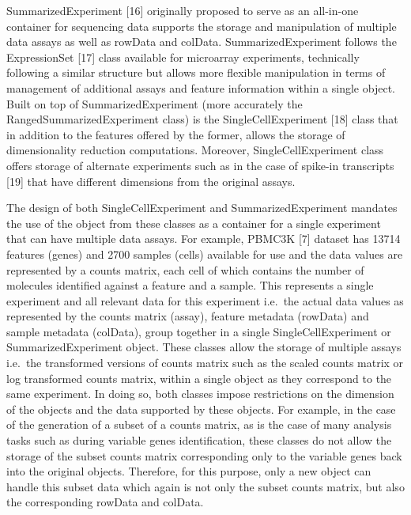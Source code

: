 \documentclass[
]{article}
\begin{document}
SummarizedExperiment {[}16{]} originally proposed to serve as an
all-in-one container for sequencing data supports the storage and
manipulation of multiple data assays as well as rowData and colData.
SummarizedExperiment follows the ExpressionSet {[}17{]} class available
for microarray experiments, technically following a similar structure
but allows more flexible manipulation in terms of management of
additional assays and feature information within a single object. Built
on top of SummarizedExperiment (more accurately the
RangedSummarizedExperiment class) is the SingleCellExperiment {[}18{]}
class that in addition to the features offered by the former, allows the
storage of dimensionality reduction computations. Moreover,
SingleCellExperiment class offers storage of alternate experiments such
as in the case of spike-in transcripts {[}19{]} that have different
dimensions from the original assays.

The design of both SingleCellExperiment and SummarizedExperiment
mandates the use of the object from these classes as a container for a
single experiment that can have multiple data assays. For example,
PBMC3K {[}7{]} dataset has 13714 features (genes) and 2700 samples
(cells) available for use and the data values are represented by a
counts matrix, each cell of which contains the number of molecules
identified against a feature and a sample. This represents a single
experiment and all relevant data for this experiment i.e.~the actual
data values as represented by the counts matrix (assay), feature
metadata (rowData) and sample metadata (colData), group together in a
single SingleCellExperiment or SummarizedExperiment object. These
classes allow the storage of multiple assays i.e.~the transformed
versions of counts matrix such as the scaled counts matrix or log
transformed counts matrix, within a single object as they correspond to
the same experiment. In doing so, both classes impose restrictions on
the dimension of the objects and the data supported by these objects.
For example, in the case of the generation of a subset of a counts
matrix, as is the case of many analysis tasks such as during variable
genes identification, these classes do not allow the storage of the
subset counts matrix corresponding only to the variable genes back into
the original objects. Therefore, for this purpose, only a new object can
handle this subset data which again is not only the subset counts
matrix, but also the corresponding rowData and colData.
\end{document}
